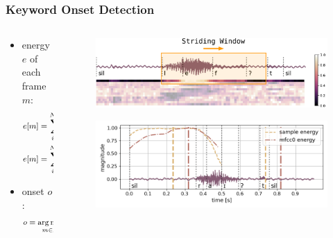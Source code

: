 \begin{frame}
  \frametitle{Keyword Onset Detection}
  \begin{columns}
    \begin{column}{0.5\textwidth}
      \begin{itemize}
        \item energy $e$ of each frame $m$:
        \begin{equation*}
          \footnotesize
          \begin{aligned}
            e[m] &= \sum_{i=0}^{N-1} \abs{x[m + i]}^2, \quad \mathrm{or}\\
            e[m] &= \sum_{i=0}^{N-1} u_0[m + i],\\
          \end{aligned}
        \end{equation*}

         \item onset $o$:
        \begin{equation*}
          \footnotesize
          \begin{aligned}
            o &= \underset{m \in \mathcal{M}}{\arg \max} \, e[m]
          \end{aligned}
        \end{equation*}
      \end{itemize}
    \end{column}
    \begin{column}{0.5\textwidth}
      \centering
      \begin{figure} \hspace{0.75cm} \includegraphics[width=1.0\textwidth]{../3_signal/figs/signal_onset_window.pdf} \end{figure}
      \begin{figure} \includegraphics[width=1.0\textwidth]{../3_signal/figs/signal_onset_showcase_right0.png} \end{figure}
      \vfill
    \end{column}
  \end{columns}
\end{frame}